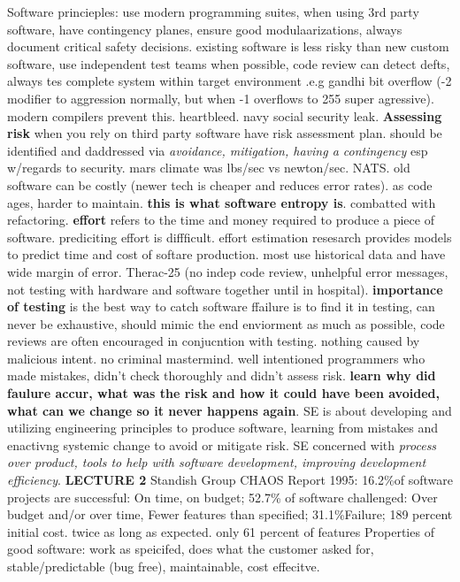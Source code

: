 \documentclass[10pt]{article}
\begin{document}
\begin{landscape}
\begin{multicols*}{6}
Software princieples: use modern programming suites, when using 3rd party software, have contingency planes, ensure good modulaarizations, always document critical safety decisions. existing software is less risky than new custom software, use independent test teams when possible, code review can detect defts, always tes complete system within target environment .e.g gandhi bit overflow (-2 modifier to aggression normally, but when -1 overflows to 255 super agressive). modern compilers prevent this. heartbleed. navy social security leak. \textbf{Assessing risk} when you rely on third party software have risk assessment plan. should be identified and daddressed via \textit{avoidance, mitigation, having a contingency} esp w/regards to security. mars climate was lbs/sec vs newton/sec. NATS. old software can be costly (newer tech is cheaper and reduces error rates). as code ages, harder to maintain. \textbf{this is what software entropy is}. combatted with refactoring. \textbf{effort} refers to the time and money required to produce a piece of software. prediciting effort is diffficult. effort estimation resesarch provides models to predict time and cost of softare production. most use historical data and have wide margin of error. Therac-25 (no indep code review, unhelpful error messages, not testing with hardware and software together until in hospital). \textbf{importance of testing} is the best way to catch software ffailure is to find it in testing, can never be exhaustive, should mimic the end enviorment as much as possible, code reviews are often encouraged in conjucntion with testing. nothing caused by malicious intent. no criminal mastermind. well intentioned programmers who made mistakes, didn't check thoroughly and didn't assess risk. \textbf{learn why did faulure accur, what was the risk and how it could have been avoided, what can we change so it never happens again}.
SE is about developing and utilizing engineering principles to produce software, learning from mistakes and enactivng systemic change to avoid or mitigate risk. SE concerned with \textit{process over product, tools to help with software development, improving development efficiency}.
\textbf{LECTURE 2}
Standish Group CHAOS Report 1995:
16.2\%of software projects are successful: On time, on budget;
52.7\% of software challenged: Over budget and/or over time, Fewer features than specified;
31.1\%Failure;
189 percent initial cost. twice as long as expected. only 61 percent of features
Properties of good software: work as speicifed, does what the customer asked for, stable/predictable (bug free), maintainable, cost effecitve.

\end{multicols*}
\end{landscape}
\end{document}
